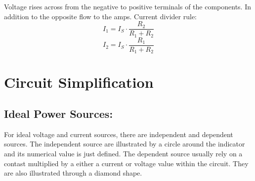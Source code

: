 \documentclass[a5paper]{article}
\begin{document}
\begin{center}
	\end{center}
	\pagebreak
	Voltage rises across from the negative to positive terminals of the components. In addition to the opposite flow to the amps. Current divider rule:
	$$I_{1}=I_{S}\cdot\frac{R_{2}}{R_{1}+R_{2}}$$
	$$I_{2}=I_{S}\cdot\frac{R_{1}}{R_{1}+R_{2}}$$
	
	\section{Circuit Simplification}
	\subsection{Ideal Power Sources:}
	For ideal voltage and current sources, there are independent and dependent sources. The independent source are illustrated by a circle around the indicator and its numerical value is just defined. The dependent source usually rely on a contast multiplied by a either a current or voltage value within the circuit. They are also illustrated through a diamond shape.
\end{document}
